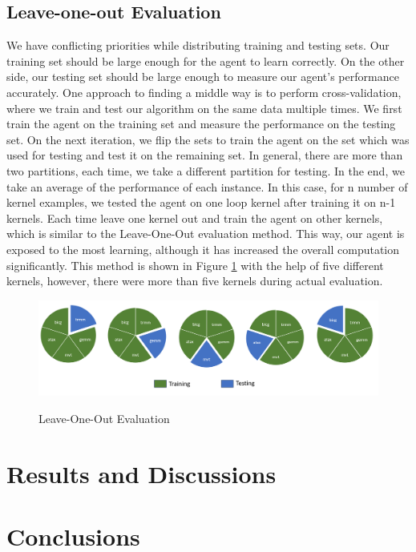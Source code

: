 \documentclass[logo,msc]{infthesis}           %
\begin{document}
\section{Leave-one-out Evaluation}

We have conflicting priorities while distributing training and testing sets. Our training set should be large enough for the agent to learn correctly. On the other side, our testing set should be large enough to measure our agent's performance accurately. One approach to finding a middle way is to perform cross-validation, where we train and test our algorithm on the same data multiple times. We first train the agent on the training set and measure the performance on the testing set. On the next iteration, we flip the sets to train the agent on the set which was used for testing and test it on the remaining set. In general, there are more than two partitions, each time, we take a different partition for testing. In the end, we take an average of the performance of each instance. In this case, for n number of kernel examples, we tested the agent on one loop kernel after training it on n-1 kernels. Each time leave one kernel out and train the agent on other kernels, which is similar to the Leave-One-Out evaluation method. This way, our agent is exposed to the most learning, although it has increased the overall computation significantly. This method is shown in Figure \ref{fig:leave_one_out} with the help of five different kernels, however, there were more than five kernels during actual evaluation.

\begin{figure}[htbp]
  \centering
  \includegraphics[width=\textwidth]{Images/Leave_One_Out.png}
  \label{fig:leave_one_out}  
  \caption{Leave-One-Out Evaluation}
\end{figure}

\chapter{Results and Discussions}

\chapter{Conclusions}
\end{document}
